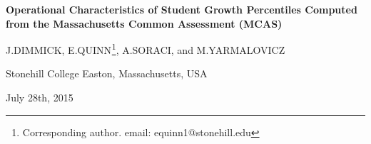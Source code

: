 \documentclass[reqno,12pt]{amsart}
\theoremstyle{plain}
\numberwithin{equation}{section} %
\numberwithin{figure}{section} %
\theoremstyle{remark}
\begin{document}
\vspace{3 cm}
\begin{center}
\textbf{Operational Characteristics of Student Growth Percentiles Computed from the Massachusetts Common Assessment (MCAS)}
\end{center}
\vspace{1 cm}

\begin{center}
J.DIMMICK, E.QUINN$^{}$\footnote[1]{Corresponding author. email: equinn1@stonehill.edu}, A.SORACI, and M.YARMALOVICZ
\end{center}
\begin{center}
\par\vspace{0.2 cm}
\small
Stonehill College
\linebreak
Easton, Massachusetts, USA  
\end{center}

\begin{center}
\par\vspace{1 cm}
July 28th, 2015
\par\vspace{1 cm}
\end{center}


\noindent
\normalsize

\par\vspace{7.5 cm}

\pagebreak 
\par\vspace{0.3 cm}
\end{document}
